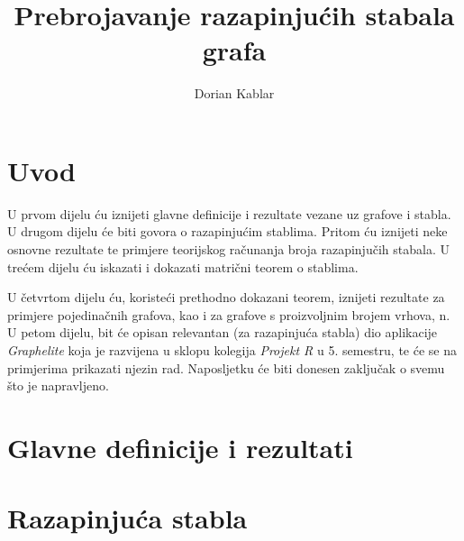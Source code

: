 \documentclass[times, utf8, zavrsni]{fer}
\begin{document}

\title{Prebrojavanje razapinjućih stabala grafa}

\author{Dorian Kablar}

\maketitle

\izvornik


\tableofcontents

\chapter{Uvod}
U prvom dijelu ću iznijeti glavne definicije i rezultate vezane uz grafove i stabla. U drugom dijelu će biti govora o razapinjućim stablima. Pritom ću iznijeti neke osnovne rezultate te primjere teorijskog računanja broja razapinjučih stabala. 
U trećem dijelu ću iskazati i dokazati matrični teorem o stablima. 

U četvrtom dijelu ću, koristeći prethodno dokazani teorem, iznijeti rezultate za primjere pojedinačnih grafova, kao i za grafove s proizvoljnim brojem vrhova, n. U petom dijelu, bit će opisan relevantan (za razapinjuća stabla) dio aplikacije \textit{Graphelite} koja je razvijena u sklopu kolegija \textit{Projekt R} u 5. semestru, te će se na primjerima prikazati njezin rad. Naposljetku će biti donesen zaključak o svemu što je napravljeno.

\chapter{Glavne definicije i rezultati}

\chapter{Razapinjuća stabla}
\end{document}
